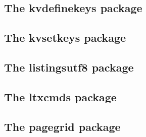 \documentclass[a4paper,12pt]{article}
\makeatletter
\providecommand*{\pdfTeX}{pdf\TeX}
\providecommand*{\iniTeX}{\mbox{ini-\TeX}}
\providecommand*{\eTeX}{$\csname m@th\endcsname\varepsilon$-\TeX}
\newcommand*{\xpackage}[1]{\textsf{#1}}
\newcommand*{\cs}[1]{\texttt{\textbackslash#1}}
\newcommand*{\tocinclude}[1]{%
  \setcounter{tocdepth}{3}%
  \begingroup
    \makeatletter
    \def\@prj{#1}%
    \let\contentsline\foreign@contentsline
  \endgroup
}
\def\foreign@contentsline#1#2#3#4{%
  \ifx\\#4\\%
    \csname l@#1\endcsname{#2}{#3}%
  \else
    \ifHy@linktocpage
      \csname l@#1\endcsname{{#2}}{%
        \hyper@linkfile{#3}{\@prj.pdf}{#4}%
      }%
    \else
      \csname l@#1\endcsname{%
        \hyper@linkfile{#2}{\@prj.pdf}{#4}%
      }{#3}%
    \fi
  \fi
}%
\newcommand*{\pkgsectformat}[1]{%
  \texorpdfstring{%
    \textcolor{link}{The} %
    \xpackage{#1} %
    \textcolor{link}{package}%
  }{#1}%
}
\makeatother
\begin{document}
\newpage
\subsection{\pkgsectformat{kvdefinekeys}}
\label{kvdefinekeys}
\begin{abstract}
Package \xpackage{kvdefinekeys} provides \cs{kv@define@key} to define
keys the same way as \xpackage{keyval}'s \cs{define@key}. However, it
works also using \iniTeX.
\end{abstract}
\tocinclude{kvdefinekeys}

\newpage
\subsection{\pkgsectformat{kvsetkeys}}
\label{kvsetkeys}
\begin{abstract}
Package \xpackage{kvsetkeys} provides \cs{kvsetkeys}, a variant
of package \xpackage{keyval}'s \cs{setkeys}. It allows to specify
a handler that deals with unknown options. Active commas and equal
signs may be used (e.g. see \xpackage{babel}'s shorthands) and
only one level of curly braces is removed from the values.
\end{abstract}
\tocinclude{kvsetkeys}

\newpage
\subsection{\pkgsectformat{listingsutf8}}
\label{listingsutf8}
\begin{abstract}
Package \xpackage{listings} does not support files with multi-byte
encodings such as UTF-8. In case of \cs{lstinputlisting} a simple
workaround is possible if an one-byte encoding exists that the file
can be converted to. Also \eTeX\ and \pdfTeX\ regardless of its mode
are required.
\end{abstract}
\tocinclude{listingsutf8}

\newpage
\subsection{\pkgsectformat{ltxcmds}}
\label{ltxcmds}
\begin{abstract}
The package \xpackage{ltxcmds} exports some utility macros
from the \LaTeX\ kernel into a separate namespace and
also provides them for other formats such as plain-\TeX.
\end{abstract}
\tocinclude{ltxcmds}

\newpage
\subsection{\pkgsectformat{pagegrid}}
\label{pagegrid}
\begin{abstract}
The \LaTeX\ package prints a page grid in the background.
\end{abstract}
\tocinclude{pagegrid}
\end{document}
